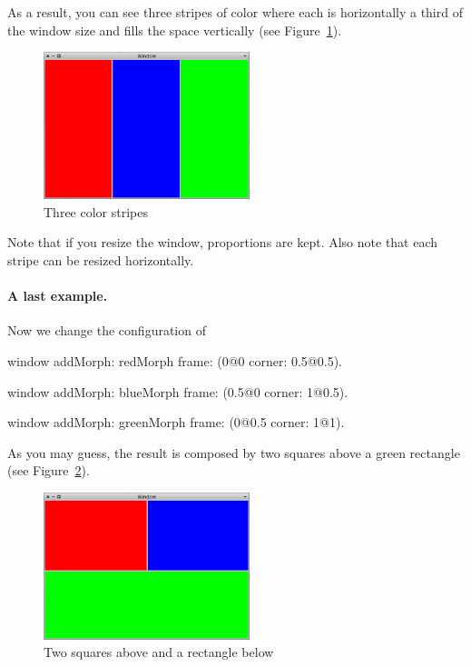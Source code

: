 \documentclass[a4paper,10pt,twoside]{book}
\begin{document}
As a result, you can see three stripes of color where each is horizontally a third of the window size and fills the space vertically (see Figure~\ref{fig:simpleLayoutExample2}).

\begin{figure}[ht]\centering
	\includegraphics[width=6cm]{SimpleLayoutExample2}
	\caption{Three color stripes}
	\label{fig:simpleLayoutExample2}
\end{figure}

Note that if you resize the window, proportions are kept. Also note that each stripe can be resized horizontally.

\paragraph{A last example.}
Now we change the configuration of 
\begin{code}{}
window
	addMorph: redMorph
	frame: (0@0 corner: 0.5@0.5).

window
	addMorph: blueMorph
	frame: (0.5@0 corner: 1@0.5).

window
	addMorph: greenMorph
	frame: (0@0.5 corner: 1@1).
\end{code}

As you may guess, the result is composed by two squares above a green rectangle (see Figure~\ref{fig:simpleLayoutExample3}).

\begin{figure}[ht]\centering
	\includegraphics[width=6cm]{SimpleLayoutExample3}
	\caption{Two squares above and a rectangle below}
	\label{fig:simpleLayoutExample3}
\end{figure}
\end{document}
